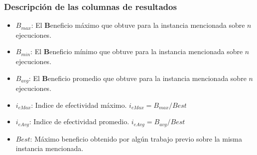 \documentclass{beamer}
\begin{document}

\begin{frame}
\frametitle{Descripción de las columnas de resultados}

\begin{itemize}
	\item \textbf{$B_{max}$}: El \textbf{B}eneficio máximo que obtuve para la instancia mencionada sobre $n$ ejecuciones.
	\item \textbf{$B_{min}$}: El \textbf{B}eneficio mínimo que obtuve para la instancia mencionada sobre $n$ ejecuciones.
	\item \textbf{$B_{avg}$}: El \textbf{B}eneficio promedio que obtuve para la instancia mencionada sobre $n$ ejecuciones.
	\item \textbf{$i_{eMax}$}: Indice de efectividad máximo. $i_{eMax}=B_{max}/Best$
	\item \textbf{$i_{eAvg}$}: Indice de efectividad promedio. $i_{eAvg}=B_{avg}/Best$
	\item \textbf{$Best$}: Máximo beneficio obtenido por algún trabajo previo sobre la misma instancia mencionada.
\end{itemize}

\end{frame}

\end{document}
